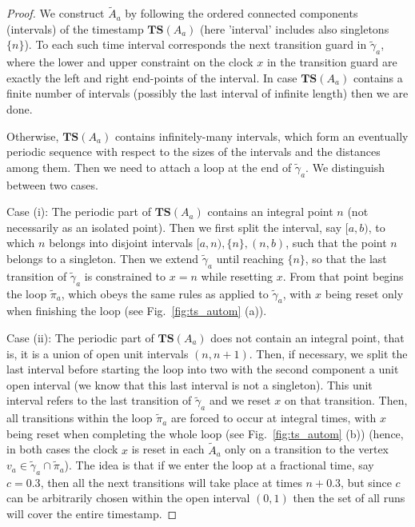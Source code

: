 \documentclass[11pt]{amsart}
\theoremstyle{definition}
\newcommand{\TTTSSS}{\mathbf{TS}}
\begin{document}
\begin{proof}
We construct $\tilde{A}_a$ by following the ordered connected components (intervals) of the timestamp $\TTTSSS(A_a)$ (here 'interval' includes also singletons $\{n\}$).
To each such time interval corresponds the next transition guard in $\tilde{\gamma}_a$, where the lower and upper constraint on the clock $x$ in the transition guard are exactly the left and right end-points of the interval.
In case $\TTTSSS(A_a)$ contains a finite number of intervals (possibly the last interval of infinite length) then we are done.

Otherwise, $\TTTSSS(A_a)$ contains infinitely-many intervals, which form an eventually periodic sequence with respect to the sizes of the intervals and the distances among them. 
Then we need to attach a loop at the end of $\tilde{\gamma}_a$.
We distinguish between two cases.

Case (i): The periodic part of $\TTTSSS(A_a)$ contains an integral point $n$ (not necessarily as an isolated point).
Then we first split the interval, say $[a,b)$, to which $n$ belongs into disjoint intervals $[a,n), \{n\}, (n,b)$, such that the point $n$ belongs to a singleton. 
Then we extend $\tilde{\gamma}_a$ until reaching $\{n\}$, so that the last transition of $\tilde{\gamma}_a$ is constrained to $x = n$ while resetting $x$. 
From that point begins the loop $\tilde{\pi}_a$, which obeys the same rules as applied to $\tilde{\gamma}_a$, with $x$ being reset only when finishing the loop (see Fig.~\ref{fig:ts_autom} (a)).

Case (ii): The periodic part of $\TTTSSS(A_a)$ does not contain an integral point, that is, it is a union of open unit intervals $(n,n+1)$.
Then, if necessary, we split the last interval before starting the loop into two with the second component a unit open interval (we know that this last interval is not a singleton).
This unit interval refers to the last transition of $\tilde{\gamma}_a$ and we reset $x$ on that transition. 
Then, all transitions within the loop $\tilde{\pi}_a$ are forced to occur at integral times, with $x$ being reset when completing the whole loop (see Fig.~\ref{fig:ts_autom} (b)) (hence, in both cases the clock $x$ is reset in each $\tilde{A}_a$ only on a transition to the vertex $v_a \in \tilde{\gamma}_a \cap \tilde{\pi}_a$).
The idea is that if we enter the loop at a fractional time, say $c = 0.3$, then all the next transitions will take place at times $n + 0.3$, but since $c$ can be arbitrarily chosen within the open interval $(0,1)$ then the set of all runs will cover the entire timestamp.
\end{proof}
\end{document}
